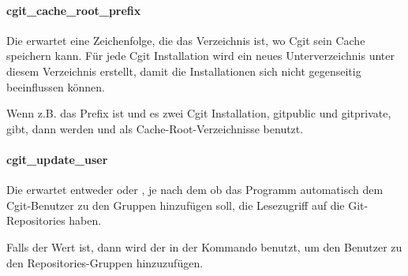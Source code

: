 \paragraph{cgit\_cache\_root\_prefix}

Die  erwartet eine Zeichenfolge, die das
Verzeichnis ist, wo Cgit sein Cache speichern kann. Für jede Cgit Installation
wird ein neues Unterverzeichnis unter diesem Verzeichnis erstellt, damit die
Installationen sich nicht gegenseitig beeinflussen können.

Wenn z.B. das Prefix  ist und es zwei Cgit Installation, gitpublic und gitprivate,
gibt, dann werden  und  als Cache-Root-Verzeichnisse
benutzt.

\paragraph{cgit_update_user}

Die  erwartet entweder  oder
, je nach dem ob das Programm automatisch dem Cgit-Benutzer zu
den Gruppen hinzufügen soll, die Lesezugriff auf die Git-Repositories haben.

Falls der Wert  ist, dann wird der in der
 Kommando benutzt, um den Benutzer zu den
Repositories-Gruppen hinzuzufügen.
